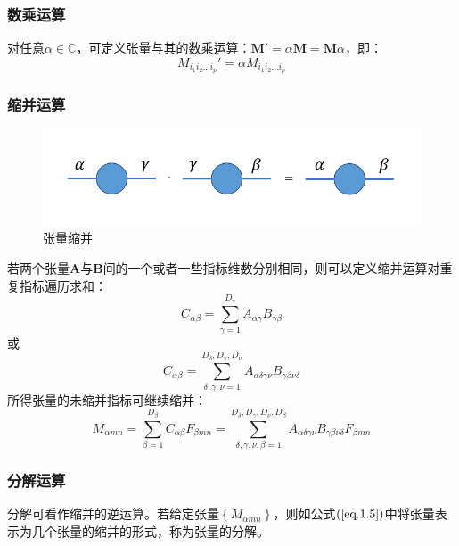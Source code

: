 \subsubsection{数乘运算}

对任意$\alpha \in \mathbb{C}$，可定义张量与其的数乘运算：$\symbf{M}' = \alpha \symbf{M} = \symbf{M} \alpha$，即：
\begin{equation}
M_{i_1 i_2 \dots i_p}' = \alpha M_{i_1 i_2 \dots i_p}
\end{equation}

\subsubsection{缩并运算}
\begin{figure}[htb]
	\centering
	\includegraphics[width=1\textwidth]{image/TensorContr.png}
	\caption{张量缩并}
	\label{fig:contract}
\end{figure}

若两个张量$\symbf{A}$与$\symbf{B}$间的一个或者一些指标维数分别相同，则可以定义缩并运算对重复指标遍历求和：
\begin{equation}
C_{\alpha\beta} = \sum_{\gamma=1}^{D_\gamma} A_{\alpha\gamma} B_{\gamma\beta}
\end{equation}
或
\begin{equation}
C_{\alpha\beta} = \sum_{\delta,\gamma,\nu=1}^{D_\delta,D_\gamma,D_\nu} A_{\alpha\delta\gamma\nu} B_{\gamma\beta\nu\delta}
\end{equation}
所得张量的未缩并指标可继续缩并：
\begin{equation}
\label{eq.1.5}
M_{\alpha m n} = \sum_{\beta=1}^{D_\beta} C_{\alpha\beta} F_{\beta m n}
	= \sum_{\delta,\gamma,\nu,\beta=1}^{D_\delta,D_\gamma,D_\nu,D_\beta} A_{\alpha\delta\gamma\nu} B_{\gamma\beta\nu\delta} F_{\beta m n}
\end{equation}

\subsubsection{分解运算}

分解可看作缩并的逆运算。若给定张量$\left\{M_{\alpha m n}\right\}$，则如公式$(\ref{eq.1.5})$中将张量表示为几个张量的缩并的形式，称为张量的分解。

